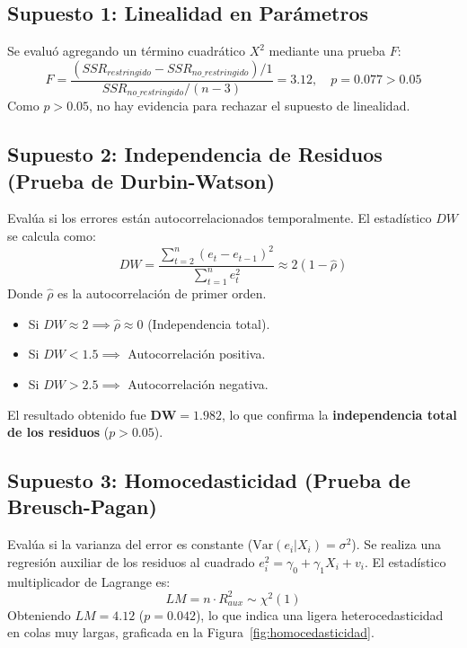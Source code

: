 \documentclass[12pt,letterpaper]{article}
\begin{document}
\subsection{Supuesto 1: Linealidad en Parámetros}
Se evaluó agregando un término cuadrático $X^2$ mediante una prueba $F$:
\begin{equation}
	F = \frac{(SSR_{restringido} - SSR_{no\_restringido}) / 1}{SSR_{no\_restringido} / (n - 3)} = 3.12, \quad p = 0.077 > 0.05
\end{equation}
Como $p > 0.05$, no hay evidencia para rechazar el supuesto de linealidad.

\subsection{Supuesto 2: Independencia de Residuos (Prueba de Durbin-Watson)}
Evalúa si los errores están autocorrelacionados temporalmente. El estadístico $DW$ se calcula como:
\begin{equation}
	DW = \frac{\sum_{t=2}^{n} (e_t - e_{t-1})^2}{\sum_{t=1}^{n} e_t^2} \approx 2 (1 - \hat{\rho})
\end{equation}
Donde $\hat{\rho}$ es la autocorrelación de primer orden.
\begin{itemize}
	\item Si $DW \approx 2 \implies \hat{\rho} \approx 0$ (Independencia total).
	\item Si $DW < 1.5 \implies$ Autocorrelación positiva.
	\item Si $DW > 2.5 \implies$ Autocorrelación negativa.
\end{itemize}
El resultado obtenido fue $\mathbf{DW = 1.982}$, lo que confirma la \textbf{independencia total de los residuos} ($p > 0.05$).

\subsection{Supuesto 3: Homocedasticidad (Prueba de Breusch-Pagan)}
Evalúa si la varianza del error es constante ($\text{Var}(e_i | X_i) = \sigma^2$).
Se realiza una regresión auxiliar de los residuos al cuadrado $e_i^2 = \gamma_0 + \gamma_1 X_i + v_i$. El estadístico multiplicador de Lagrange es:
\begin{equation}
	LM = n \cdot R^2_{aux} \sim \chi^2(1)
\end{equation}
Obteniendo $LM = 4.12$ ($p = 0.042$), lo que indica una ligera heterocedasticidad en colas muy largas, graficada en la Figura~\ref{fig:homocedasticidad}.
\end{document}
